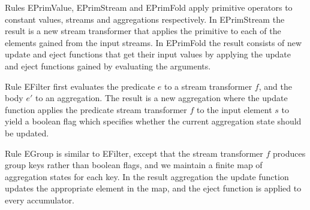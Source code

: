 
Rules EPrimValue, EPrimStream and EPrimFold apply primitive operators to constant values, streams and aggregations respectively. In EPrimStream the result is a new stream transformer that applies the primitive to each of the elements gained from the input streams. In EPrimFold the result consists of new update and eject functions that get their input values by applying the update and eject functions gained by evaluating the arguments.


Rule EFilter first evaluates the predicate $e$ to a stream transformer $f$, and the body $e'$ to an aggregation. The result is a new aggregation where the update function applies the predicate stream transformer $f$ to the input element $s$ to yield a boolean flag which specifies whether the current aggregation state should be updated.

Rule EGroup is similar to EFilter, except that the stream transformer $f$ produces group keys rather than boolean flags, and we maintain a finite map of aggregation states for each key. In the result aggregation the update function updates the appropriate element in the map, and the eject function is applied to every accumulator. 


